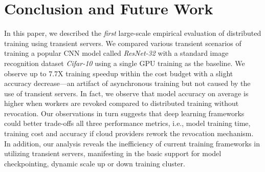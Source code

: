 \section{Conclusion and Future Work}

In this paper, we described the \emph{first} large-scale empirical evaluation of distributed training using transient servers. 
We compared various transient scenarios of training a popular CNN model called \emph{ResNet-32} with a standard image recognition dataset \emph{Cifar-10} using a single GPU training as the baseline. 
We observe up to 7.7X training speedup within the cost budget with a slight accuracy decrease---an artifact of asynchronous training but not caused by the use of transient servers. In fact, we observe that model accuracy on average is higher when workers are revoked compared to distributed training without revocation. Our observations in turn suggests that deep learning frameworks could better trade-offs all three performance metrics, i.e., model training time, training cost and accuracy if cloud providers rework the revocation mechanism. In addition, our analysis reveals the inefficiency of current training frameworks in utilizing transient servers, manifesting in the basic support for model checkpointing, dynamic scale up or down training cluster.  


%
